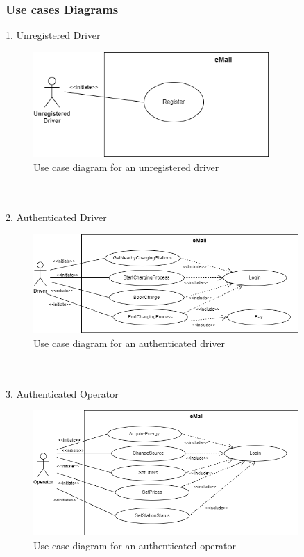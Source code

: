 \documentclass[../main.tex]{subfiles}
\begin{document}
\subsubsection{Use cases Diagrams}
\hspace{1em}1. Unregistered Driver
\begin{figure}[H]
    \centering
    \includegraphics[width=0.8\textwidth]{usecases/uc_unregistered.png}
    \caption{Use case diagram for an unregistered driver}
    \label{fig:unregistered}
\end{figure}
\\
\\
2. Authenticated Driver
\begin{figure}[H]
    \centering
    \includegraphics[width=0.9\textwidth]{usecases/uc_driver.png}
    \caption{Use case diagram for an authenticated driver}
    \label{fig:driver}
\end{figure}
\\
\\
3. Authenticated Operator
\begin{figure}[H]
    \centering
    \includegraphics[width=0.9\textwidth]{usecases/uc_operator.png}
    \caption{Use case diagram for an authenticated operator}
    \label{fig:operator}
\end{figure}
\end{document}
